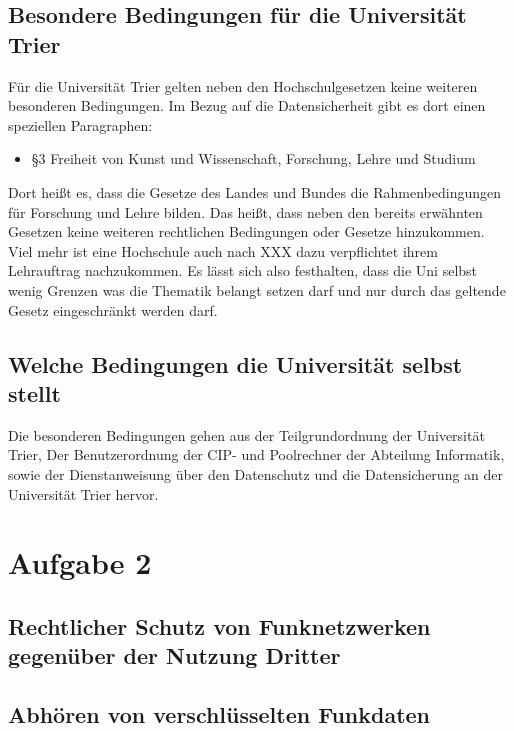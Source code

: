 \documentclass[10pt,a4paper]{article}
\begin{document}
\subsection*{Besondere Bedingungen für die Universität Trier}
Für die Universität Trier gelten neben den Hochschulgesetzen keine weiteren besonderen Bedingungen. Im Bezug auf die Datensicherheit gibt es dort einen speziellen Paragraphen:
\begin{itemize}
	\item §3 Freiheit von Kunst und Wissenschaft, Forschung, Lehre und Studium
\end{itemize}
Dort heißt es, dass die Gesetze des Landes und Bundes die Rahmenbedingungen für Forschung und Lehre bilden. Das heißt, dass neben den bereits erwähnten Gesetzen keine weiteren rechtlichen Bedingungen oder Gesetze hinzukommen. Viel mehr ist eine Hochschule auch nach XXX dazu verpflichtet ihrem Lehrauftrag nachzukommen. Es lässt sich also festhalten, dass die Uni selbst wenig Grenzen was die Thematik belangt setzen darf und nur durch das geltende Gesetz eingeschränkt werden darf.

\subsection*{Welche Bedingungen die Universität selbst stellt}
Die besonderen Bedingungen gehen aus der Teilgrundordnung der Universität Trier, Der Benutzerordnung der CIP- und Poolrechner der Abteilung Informatik, sowie der Dienstanweisung über den Datenschutz und die Datensicherung an der Universität Trier hervor.

\section*{Aufgabe 2}
\subsection*{Rechtlicher Schutz von Funknetzwerken gegenüber der Nutzung Dritter}
\subsection*{Abhören von verschlüsselten Funkdaten}
\end{document}

